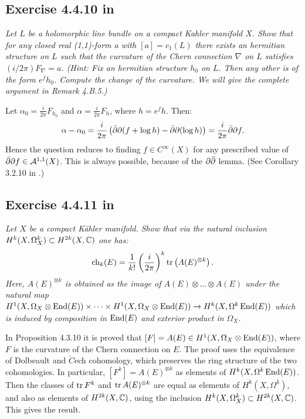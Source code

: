 \documentclass{article}
\begin{document}
\subsection*{Exercise 4.4.10 in \cite{Huy}}
\emph{Let $L$ be a holomorphic line bundle on a compact Kahler manifold
$X$. Show that for any closed real (1,1)-form a with $[a] = c_1(L)$ there exists an
hermitian structure on $L$ such that the curvature of the Chern connection $\nabla$ on $L$
satisfies $(i/2\pi)F_{\nabla} = a$. (Hint: Fix an hermitian structure $h_0$ on $L$. Then any
other is of the form $e^f h_0$. Compute the change of the curvature. We will give the
complete argument in Remark 4.B.5.)}
\vspace{3mm}

Let $\alpha_0 = \frac{i}{2\pi} F_{h_0}$ and $\alpha = \frac{i}{2\pi} F_{h}$, where $h = e^f h$. Then:
\[	\alpha - \alpha_0 = \frac{i}{2\pi} \left( \bar {\partial} \partial (f + \log h) - \bar {\partial} \partial (\log h )\right) = \frac{i}{2\pi} 
\bar {\partial} \partial f.	\]
Hence the question reduces to finding $f \in C^{\infty}(X)$ for any prescribed value of $\bar {\partial} \partial f \in \mathcal{A}^{1,1}
(X)$. This is always possible, because of the $\partial \bar {\partial}$ lemma. (See Corollary 3.2.10 in \cite{Huy}.)


\subsection*{Exercise 4.4.11 in \cite{Huy}}
\emph{Let $X$ be a compact K\"{a}hler manifold. Show that via the natural inclusion
$H^k(X, \Omega^k_X) \subset H^{2k}(X,\mathbb{C})$ one has:}
\[	\operatorname{ch}_k(E) = \frac{1}{k!} \left(\frac{i}{2\pi}\right)^k \operatorname{tr} \left(A(E)^{\otimes k} \right) .	\]
\emph{Here, $A(E)^{\otimes k}$ is obtained as the image of $A(E) \otimes \dots \otimes A(E)$ under the natural map
$H^1(X, \Omega_X \otimes \operatorname{End}(E)) \times \dots \times H^1(X, \Omega_X \otimes \operatorname{End}(E)) \to H^k(X, \Omega^k \operatorname{End}(E))$ which
is induced by composition in $\operatorname{End}(E)$ and exterior product in $\Omega_X$.}
\vspace{3mm}

In Proposition 4.3.10 it is proved that $[F] = A(E) \in H^1(X,\Omega_X \otimes \operatorname{End}(E))$, where $F$ is the curvature of the
Chern connection on $E$. The proof uses the equivalence of Dolbeault and $\check{C}$ech cohomology, which preserves
the ring structure of the two cohomologies. In particular, $[F^k] = A(E)^{\otimes k}$ as elements of
$H^k(X, \Omega^k \operatorname{End}(E))$. Then the classes of $\operatorname{tr} F^k$ and $\operatorname{tr} A(E)^{\otimes k}$ are equal as elements of
$H^k(X,\Omega^k)$, and also as elements of $H^{2k}(X,\mathbb{C})$, using the inclusion $H^k(X, \Omega^k_X) \subset H^{2k}(X,\mathbb{C})$.
This gives the result.
\end{document}
